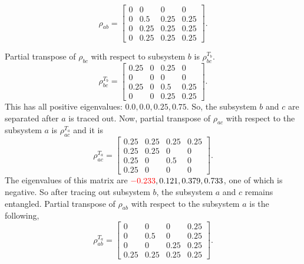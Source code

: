 \documentclass{amsart}
\theoremstyle{plain}
\theoremstyle{definition}
\theoremstyle{plain}
\begin{document}
	\begin{equation*}
		\rho_{ab} = \left[\begin{matrix}0 & 0 & 0 & 0\\0 & 0.5 & 0.25 & 0.25\\0 & 0.25 & 0.25 & 0.25\\0 & 0.25 & 0.25 & 0.25\end{matrix}\right].
	\end{equation*}

	Partial transpose of $\rho_{bc}$ with respect to subsystem $b $ is $\rho^{T_b}_{bc}$.
	\begin{equation*}
		\rho^{T_b}_{bc} = \left[\begin{matrix}0.25 & 0 & 0.25 & 0\\0 & 0 & 0 & 0\\0.25 & 0 & 0.5 & 0.25\\0 & 0 & 0.25 & 0.25\end{matrix}\right].
	\end{equation*}
	This has all positive eigenvalues: $0.0, 0.0, 0.25, 0.75$. So, the subsystem $b$ and $c$ are separated after $a$ is traced out. Now, partial transpose of $\rho_{ac}$ with respect to the subsystem $a$ is $\rho^{T_a}_{ac}$ and it is
	\begin{equation*}
		\rho^{T_a}_{ac} = \left[\begin{matrix}0.25 & 0.25 & 0.25 & 0.25\\0.25 & 0.25 & 0 & 0\\0.25 & 0 & 0.5 & 0\\0.25 & 0 & 0 & 0\end{matrix}\right].
	\end{equation*}
	The eigenvalues of this matrix are $\mathcolor{red}{-0.233}, 0.121, 0.379, 0.733$, one of which is negative. So after tracing out subsystem $b$, the subsystem $a$ and $c$ remains entangled.
	Partial transpose of $\rho_{ab}$ with respect to the subsystem $a$ is the following,
	\begin{equation*}
		\rho^{T_a}_{ab} = \left[\begin{matrix}0 & 0 & 0 & 0.25\\0 & 0.5 & 0 & 0.25\\0 & 0 & 0.25 & 0.25\\0.25 & 0.25 & 0.25 & 0.25\end{matrix}\right].
	\end{equation*}
\end{document}
